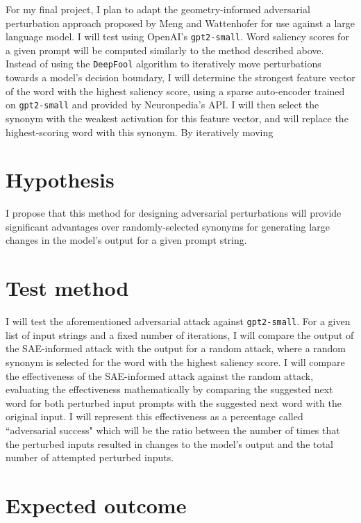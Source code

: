 \documentclass{article}
\begin{document}
For my final project, I plan to adapt the geometry-informed adversarial perturbation approach proposed by Meng and Wattenhofer for use against a large language model. I will test using OpenAI's \texttt{gpt2-small}. Word saliency scores for a given prompt will be computed similarly to the method described above. Instead of using the \texttt{DeepFool} algorithm to iteratively move perturbations towards a model's decision boundary, I will determine the strongest feature vector of the word with the highest saliency score, using a sparse auto-encoder trained on \texttt{gpt2-small} and provided by Neuronpedia's API. I will then select the synonym with the weakest activation for this feature vector, and will replace the highest-scoring word with this synonym. By iteratively moving 

\section*{Hypothesis}

I propose that this method for designing adversarial perturbations will provide significant advantages over randomly-selected synonyms for generating large changes in the model's output for a given prompt string.

\section*{Test method}

I will test the aforementioned adversarial attack against \texttt{gpt2-small}. For a given list of input strings and a fixed number of iterations, I will compare the output of the SAE-informed attack with the output for a random attack, where a random synonym is selected for the word with the highest saliency score. I will compare the effectiveness of the SAE-informed attack against the random attack, evaluating the effectiveness mathematically by comparing the suggested next word for both perturbed input prompts with the suggested next word with the original input. I will represent this effectiveness as a percentage called ``adversarial success" which will be the ratio between the number of times that the perturbed inputs resulted in changes to the model's output and the total number of attempted perturbed inputs.

\section*{Expected outcome}
\end{document}
